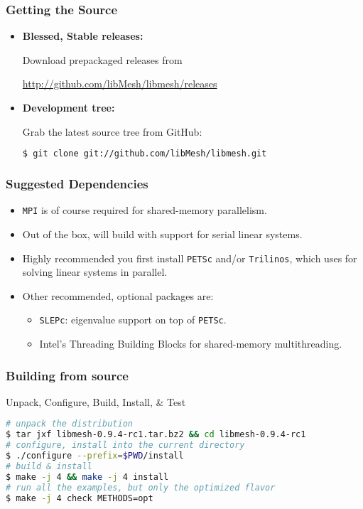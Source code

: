 \begin{frame}[fragile]
  \frametitle{Getting the \libMesh{} Source}

  \begin{block}{}
    \begin{itemize}
    \item \textbf{Blessed, Stable releases:}

      Download prepackaged releases from

      \scriptsize{\url{http://github.com/libMesh/libmesh/releases}}
      \normalsize
    \item \textbf{Development tree:}

      Grab the latest source tree from GitHub:
      \begin{lstlisting}[language=bash]
$ git clone git://github.com/libMesh/libmesh.git
      \end{lstlisting}
    \end{itemize}
  \end{block}
\end{frame}

\begin{frame}
  \frametitle{\libMesh{} Suggested Dependencies}
  \begin{itemize}
    \item  \texttt{MPI} is of course required for shared-memory parallelism.
    \item Out of the box, \libMesh{} will build with support for serial linear systems.
    \item Highly recommended you first install \texttt{PETSc} and/or \texttt{Trilinos}, which \libMesh{} uses for solving linear systems in parallel.
      \item Other recommended, optional packages are:
        \begin{itemize}
          \item \texttt{SLEPc}: eigenvalue support on top of \texttt{PETSc}.
          \item Intel's Threading Building Blocks for shared-memory multithreading.
        \end{itemize}
  \end{itemize}
\end{frame}

\begin{frame}[fragile]
  \frametitle{Building \libMesh{} from source}

  \begin{block}{Unpack, Configure, Build, Install, \& Test}
    \begin{lstlisting}[language=bash]
# unpack the distribution
$ tar jxf libmesh-0.9.4-rc1.tar.bz2 && cd libmesh-0.9.4-rc1
# configure, install into the current directory
$ ./configure --prefix=$PWD/install
# build & install
$ make -j 4 && make -j 4 install
# run all the examples, but only the optimized flavor
$ make -j 4 check METHODS=opt
    \end{lstlisting}
  \end{block}
\end{frame}



